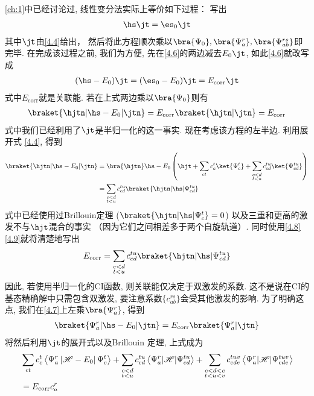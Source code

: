 \autoref{ch:1}中已经讨论过, 线性变分法实际上等价如下过程： 写出
\begin{align}
\hs\jt = \es_0\jt
\label{4.6}
\end{align}
其中$ \jt $由\autoref{4.4}给出， 
然后将此方程顺次乘以$ \bra{\Psi_0},\bra{\Psi_a^r} ,\bra{\Psi_{ab}^{rs}}$即完毕. 
在完成该过程之前, 
我们为方便, 
先在\autoref{4.6}的两边减去$ E_0\jt $, 
如此\autoref{4.6}就改写成
\begin{align}
(\hs -E_0)\jt = (\es_0-E_0)\jt = E_\mathrm{corr} \jt
\label{4.7}
\end{align} 
式中$E_\mathrm{corr}$就是关联能. 
若在上式两边乘以$\bra{\Psi_0}$则有
\begin{align}
\label{4.8}
\braket{\hjtn|\hs-E_0|\jtn} = E_\mathrm{corr} \braket{\hjtn|\jtn} = E_\mathrm{corr}
\end{align}
式中我们已经利用了$\jt$是半归一化的这一事实. 
现在考虑该方程的左半边. 
利用展开式 \autoref{4.4}, 
得到
\begin{align}
\braket{\hjtn|\hs-E_0|\jtn} & = \bra{\hjtn}\hs-E_0\left( \hjt + \sum_{ct}c_c^t\ket{\Psi_c^t} + \sum_{\substack{c<d\\t<u}} c_{cd}^{tu}\ket{\Psi_{cd}^{tu}} \right)\notag \\
	&=\sum_{\substack{c<d\\t<u}}c_{cd}^{tu}\braket{\hjtn|\hs|\Psi_{cd}^{tu}} \label{4.9}
\end{align}
式中已经使用过Brillouin定理 ($ \braket{\hjtn|\hs|\Psi_c^t }=0$) 以及三重和更高的激发不与$\hjt$混合的事实 （因为它们之间相差多于两个自旋轨道）. 
同时使用\autoref{4.8}\autoref{4.9}就将清楚地写出
\begin{align}
E_\mathrm{corr} = \sum_{\substack{c<d\\t<u}}c_{cd}^{tu}\braket{\hjtn|\hs|\Psi_{cd}^{tu}}
\end{align}
因此, 
若使用半归一化的CI函数, 
则关联能仅决定于双激发的系数. 
这不是说在CI的基态精确解中只需包含双激发, 
要注意系数$ \{c_{ab}^{rs}\} $会受其他激发的影响. 
为了明确这点, 
我们在\autoref{4.7}上左乘$ \bra{\Psi_a^r} $, 
得到
\begin{align}
\braket{\Psi_a^r|\hs-E_0|\jtn} = E_\mathrm{corr} \braket{\Psi_a^r|\jtn}
\label{4.10}
\end{align}
将然后利用$\jt$的展开式以及Brillouin 定理, 
上式成为
\begin{align}
&\sum_{c t} c_{c}^{t}\left\langle\Psi_{a}^{r}\left|\mathscr{H}-E_{0}\right| \Psi_{c}^{t}\right\rangle+\sum_{\substack{c<d \\ t<u}} c_{cd}^{t u}\left\langle\Psi_{a}^{r}|\mathscr{H}| \Psi_{c d}^{t u}\right\rangle+\sum_{\substack{c<d<e\\ t<u<v}} c_{c d e}^{t u v}\left\langle\Psi_{a}^{r}|\mathscr{H}| \Psi_{c d e}^{t u v}\right\rangle \notag \\
&=E_{\mathrm{corr}} c_{a}^{r}
\label{4.11}
\end{align}
